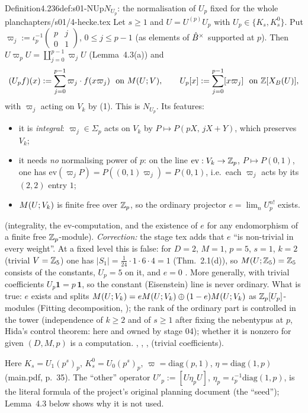 \begin{quoted}{Definition}{4.2}{36}{def:s01-NUp}{$N_{U_p}$: the normalisation of $U_p$ fixed for the whole plan}{chapters/s01/4-hecke.tex}\label{rpt:def:s01-NUp}
Let $s\ge1$ and $U=U^{(p)}U_p$ with $U_p\in\{K_s,K^0_s\}$. Put $\varpi_j:=\iota_p^{-1}\left(\begin{smallmatrix}p&j\\0&1\end{smallmatrix}\right)$,
$0\le j\le p-1$ (as elements of $\hat{B}^\times$ supported at $p$). Then $U\varpi_pU=\coprod_{j=0}^{p-1}\varpi_jU$
(Lemma~4.3(a)) and
\[(U_pf)(x):=\sum_{j=0}^{p-1}\varpi_j\cdot f(x\varpi_j)\ \ \text{on }M(U;V),\qquad U_p[x]:=\sum_{j=0}^{p-1}[x\varpi_j]\ \ \text{on }\mathbb{Z}[X_B(U)],\]
with $\varpi_j$ acting on $V_k$ by (1). This is $N_{U_p}$. Its features:
\begin{itemize}
\item it is \emph{integral}: $\varpi_j\in\Sigma_p$ acts on $V_k$ by $P\mapsto P(pX,\,jX+Y)$, which preserves $V_k$;
\item it needs \emph{no} normalising power of $p$: on the line $\mathrm{ev}:V_k\to\mathbb{Z}_p$, $P\mapsto P(0,1)$, one has
  $\mathrm{ev}(\varpi_jP)=P((0,1)\varpi_j)=P(0,1)$, i.e.\ each $\varpi_j$ acts by its $(2,2)$ entry $1$;
\item $M(U;V_k)$ is finite free over $\mathbb{Z}_p$, so the ordinary projector $e=\lim_nU_p^{n!}$ exists.
\end{itemize}
\stproved{} (integrality, the $\mathrm{ev}$-computation, and the existence of $e$ for any endomorphism of a finite free $\mathbb{Z}_p$-module).
\emph{Correction:} the stage tex adds that $e$ ``is non-trivial in every weight''. At a fixed level this is false: for
$D=2$, $M=1$, $p=5$, $s=1$, $k=2$ (trivial $V=\mathbb{Z}_5$) one has $|S_1|=\frac{1}{24}\cdot1\cdot6\cdot4=1$ (Thm.~2.1(d)), so
$M(U;\mathbb{Z}_5)=\mathbb{Z}_5$ consists of the constants, $U_p=5$ on it, and $e=0$ \stproved. More generally, with trivial coefficients
$U_p\mathbf 1=p\,\mathbf 1$, so the constant (Eisenstein) line is never ordinary. What is true: $e$ exists and splits
$M(U;V_k)=eM(U;V_k)\oplus(1-e)M(U;V_k)$ as $\mathbb{Z}_p[U_p]$-modules (Fitting decomposition, \stproved); the
rank of the ordinary part is controlled in the tower (independence of $k\ge2$ and of $s\ge1$ after fixing the nebentypus at $p$,
Hida's control theorem: \stexp{} here and owned by stage 04); whether it is nonzero for given $(D,M,p)$ is a computation.
, , ,
 \stformal{} (trivial coefficients).
\end{quoted}
Here $K_s=U_1(p^s)_p$, $K^0_s=U_0(p^s)_p$, $\varpi=\mathrm{diag}(p,1)$, $\eta=\mathrm{diag}(1,p)$ (main.pdf, p.~35).
The ``other'' operator $U'_p:=[U\eta_pU]$, $\eta_p=\iota_p^{-1}\mathrm{diag}(1,p)$, is the literal formula of the project's original
planning document (the ``seed''); Lemma~4.3 below shows why it is not used.

